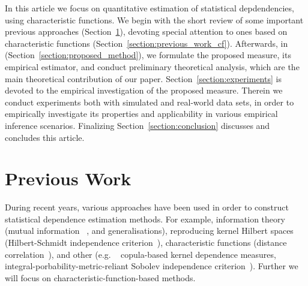 \documentclass{article}
\begin{document}
In this article we focus on quantitative estimation of statistical depdendencies, using characteristic functions. We begin with the short review of some important previous approaches (Section~\ref{section:previous_work}), devoting special attention to ones based on characteristic functions (Section~\ref{section:previous_work_cf}). Afterwards, in (Section~\ref{section:proposed_method}), we formulate the proposed measure, its empirical estimator, and conduct preliminary theoretical analysis, which are the main theoretical contribution of our paper. Section~\ref{section:experiments} is devoted to the empirical investigation of the proposed measure. Therein we conduct experiments both with simulated and real-world data sets, in order to empirically investigate its properties and applicability in various empirical inference scenarios. Finalizing Section~\ref{section:conclusion} discusses and concludes this article.


\section{Previous Work}
\label{section:previous_work}
During recent years, various approaches have been used in order to construct statistical dependence estimation methods. For example, information theory (mutual information ~\cite{Cover2006}, and generalisations), reproducing kernel Hilbert spaces (Hilbert-Schmidt independence criterion~\cite{Gretton2005MeasuringSD}), characteristic functions (distance correlation~\cite{Feuerverger, Szekely}), and other (e.g. ~\cite{Pczos2012CopulabasedKD} copula-based kernel dependence measures, integral-porbability-metric-reliant Sobolev independence criterion~\cite{NIPS2019_9147}).
Further we will focus on characteristic-function-based methods. 
\end{document}
